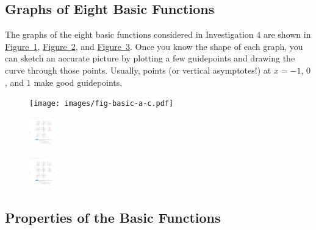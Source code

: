 \documentclass[10pt,]{book}
\theoremstyle{plain}
\theoremstyle{definition}
\theoremstyle{definition}
\theoremstyle{definition}
\theoremstyle{definition}
\theoremstyle{definition}
\numberwithin{equation}{section}
\begin{document}
\typeout{************************************************}
\typeout{************************************************}
\subsection[Graphs of Eight Basic Functions]{Graphs of Eight Basic Functions}\label{subsection-39}

        The graphs of the eight basic functions considered in Investigation 4 are shown in \hyperref[fig-basic-a-c]{Figure~\ref{fig-basic-a-c}}, \hyperref[fig-basic-d-f]{Figure~\ref{fig-basic-d-f}}, and \hyperref[fig-basic-g-h]{Figure~\ref{fig-basic-g-h}}. Once you know the shape of each graph, you can sketch an accurate picture by plotting a few guidepoints and drawing the curve through those points. Usually, points (or vertical asymptotes!) at \(x = −1\), \(0\), and \(1\) make good guidepoints.
\leavevmode%
\begin{figure}
\centering
\texttt{[image: images/fig-basic-a-c.pdf]}\caption{\label{fig-basic-a-c}}
\end{figure}
\leavevmode%
\begin{figure}
\centering
\includegraphics[width=0.100\textwidth,]{images/fig-basic-d-f.pdf}\caption{\label{fig-basic-d-f}}
\end{figure}
\leavevmode%
\begin{figure}
\centering
\includegraphics[width=0.100\textwidth,]{images/fig-basic-g-h.pdf}\caption{\label{fig-basic-g-h}}
\end{figure}
\typeout{************************************************}
\typeout{************************************************}
\subsection[Properties of the Basic Functions]{Properties of the Basic Functions}\label{subsection-40}
\end{document}
